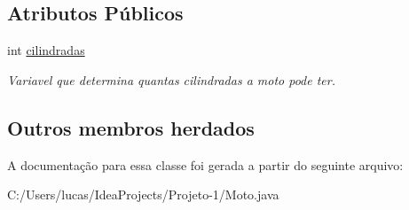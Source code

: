 \subsection*{Atributos Públicos}
\begin{DoxyCompactItemize}
\item 
\mbox{\label{class_moto_ae62f5c23f1b1b77bbda2891971e0b169}} 
int \mbox{\hyperlink{class_moto_ae62f5c23f1b1b77bbda2891971e0b169}{cilindradas}}
\begin{DoxyCompactList}\small\item\em Variavel que determina quantas cilindradas a moto pode ter. \end{DoxyCompactList}\end{DoxyCompactItemize}
\subsection*{Outros membros herdados}


A documentação para essa classe foi gerada a partir do seguinte arquivo\+:\begin{DoxyCompactItemize}
\item 
C\+:/\+Users/lucas/\+Idea\+Projects/\+Projeto-\/1/Moto.\+java\end{DoxyCompactItemize}

